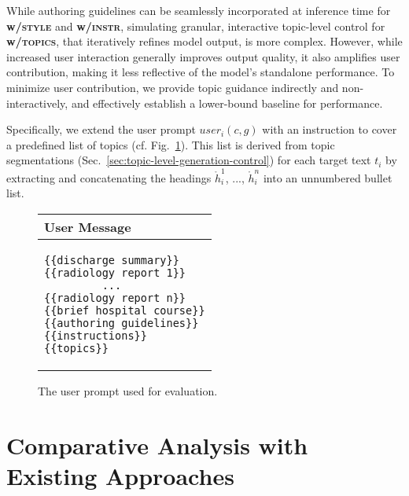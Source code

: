 While authoring guidelines can be seamlessly incorporated at inference time for \textbf{w/\textsc{style}} and \textbf{w/\textsc{instr}}, simulating granular, interactive topic-level control for \textbf{w/\textsc{topics}}, that iteratively refines model output, is more complex. However, while increased user interaction generally improves output quality, it also amplifies user contribution, making it less reflective of the model's standalone performance. To minimize user contribution, we provide topic guidance indirectly and non-interactively, and effectively establish a lower-bound baseline for performance. 

Specifically, we extend the user prompt $user_i(c,g)$ with an instruction to cover a predefined list of topics (cf. Fig.~\ref{fig:evaluation_prompt_template}). This list is derived from topic segmentations (Sec.~\ref{sec:topic-level-generation-control}) for each target text $t_i$ by extracting and concatenating the headings $\mathring{h}_i^1$, ..., $\mathring{h}_i^n$ into an unnumbered bullet list.


\begin{figure}[t!]
\centering
\begin{tabular}{p{}}
\hline
User Message \\
\hline
\vspace{-1em}
\begin{lstlisting}
{{discharge summary}}
{{radiology report 1}}
         ...
{{radiology report n}}
{{brief hospital course}}
{{authoring guidelines}}
{{instructions}}
{{topics}}
\end{lstlisting} \vspace{-1.5em} \\
\hline
\end{tabular}

\caption{The user prompt used for evaluation.}
\label{fig:evaluation_prompt_template}
\end{figure}




\section{Comparative Analysis with Existing Approaches}
\label{sec:comparative-analysis-with-existing-approaches}


